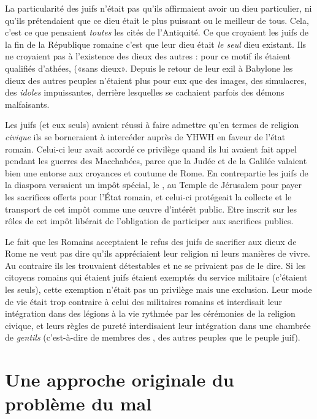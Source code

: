  La particularité des juifs n'était pas qu'ils affirmaient avoir un dieu particulier, ni qu'ils prétendaient que ce dieu était le plus puissant ou le meilleur de tous. Cela, c'est ce que pensaient \emph{toutes} les cités de l'Antiquité. Ce que croyaient les juifs de la fin de la République romaine c'est que leur dieu était \emph{le seul} dieu existant. Ils ne croyaient pas à l'existence des dieux des autres : pour ce motif ils étaient qualifiés d'athées, («{sans dieux}». Depuis le retour de leur exil à Babylone les dieux des autres peuples n'étaient plus pour eux que des images, des simulacres, des \emph{idoles} impuissantes, derrière lesquelles se cachaient parfois des démons malfaisants. 
 
 Les juifs (et eux seuls) avaient réussi à faire admettre qu'en termes de religion \emph{civique} ils se borneraient à intercéder auprès de YHWH en faveur de l'état romain. Celui-ci leur avait accordé ce privilège quand ils lui avaient fait appel pendant les guerres des Macchabées, parce que la Judée et de la Galilée valaient bien une entorse aux croyances et coutume de Rome. En contrepartie les juifs de la diaspora versaient un impôt spécial, le , au Temple de Jérusalem pour payer les sacrifices offerts pour l'État romain, et celui-ci protégeait la collecte et le transport de cet impôt comme une œuvre d'intérêt public. Etre inscrit sur les rôles de cet impôt libérait de l'obligation de participer aux sacrifices publics. 
 
 Le fait que les Romains acceptaient le refus des juifs de sacrifier aux dieux de Rome ne veut pas dire qu'ils appréciaient leur religion ni leurs manières de vivre. Au contraire ils les trouvaient détestables et ne se privaient pas de le dire. Si les citoyens romains qui étaient juifs étaient exemptés du service militaire (c'étaient les seuls), cette exemption n'était pas un privilège mais une exclusion. Leur mode de vie était trop contraire à celui des militaires romains et interdisait leur intégration dans des légions à la vie rythmée par les cérémonies de la religion civique, et leurs règles de pureté interdisaient leur intégration dans une chambrée de \emph{gentils} (c'est-à-dire de membres des , des autres peuples que le peuple juif). 

 

 




\section{Une approche originale du problème du mal}

